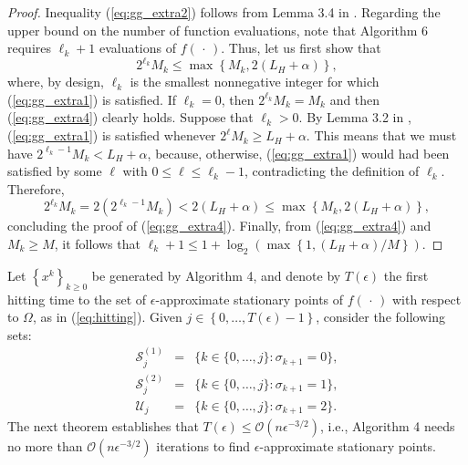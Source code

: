 \documentclass[11pt]{article}
\begin{document}
\begin{proof}
    Inequality (\ref{eq:gg_extra2}) follows from Lemma 3.4 in \cite{BM}. Regarding the upper bound on the number of function evaluations, note that Algorithm 6 requires $\ell_{k}+1$ evaluations of $f(\,\cdot\,)$. Thus, let us first show that
    \begin{equation}
     2^{\ell_{k}}M_{k}\leq\max\left\{M_{k},2(L_{H}+\alpha)\right\},
    \label{eq:gg_extra4}
    \end{equation}
    where, by design, $\ell_{k}$ is the smallest nonnegative integer for which (\ref{eq:gg_extra1}) is satisfied. If $\ell_{k}=0$, then $2^{\ell_{k}}M_{k}=M_{k}$ and then (\ref{eq:gg_extra4}) clearly holds. Suppose that $\ell_{k}>0$. By Lemma 3.2 in \cite{BM}, (\ref{eq:gg_extra1}) is satisfied whenever $2^{\ell}M_{k}\geq L_{H}+\alpha$. This means that we must have $2^{\ell_{k}-1}M_{k}<L_{H}+\alpha$, because, otherwise, (\ref{eq:gg_extra1}) would had been satisfied by some $\ell$ with $0\leq \ell\leq\ell_{k}-1$, contradicting the definition of $\ell_{k}$. Therefore, 
    \[
        2^{\ell_{k}}M_{k}=2\left(2^{\ell_{k}-1}M_{k}\right)<2(L_{H}+\alpha)\leq\max\left\{M_{k},2(L_{H}+\alpha)\right\},
    \]
    concluding the proof of (\ref{eq:gg_extra4}). Finally, from (\ref{eq:gg_extra4}) and $M_{k}\geq M$, it follows that $\ell_{k}+1\leq 1+\log_{2}\left(\max\left\{1,(L_{H}+\alpha)/M\right\}\right)$.
\end{proof}

Let $\left\{x^{k}\right\}_{k\geq 0}$ be generated by Algorithm 4, and denote by $T(\epsilon)$ the first hitting time to the set of $\epsilon$-approximate stationary points of $f(\,\cdot\,)$ with respect to $\Omega$, as in (\ref{eq:hitting}). Given $j\in\left\{0,\dots,T(\epsilon)-1\right\}$, consider the following sets:
\[
\begin{array}{rcl}
\mathcal{S}_{j}^{(1)} &=& \{k\in\{0,\dots,j\}:\sigma_{k+1}=0\},\\
\mathcal{S}_{j}^{(2)} &=& \{k\in\{0,\dots,j\}:\sigma_{k+1}=1\},\\
\mathcal{U}_{j} &=& \{k\in\{0,\dots,j\}:\sigma_{k+1}=2\}.
\end{array}
\]
The next theorem establishes that $T(\epsilon)\leq\mathcal{O}\left(n\epsilon^{-3/2}\right)$, i.e., Algorithm 4 needs no more than $\mathcal{O}(n\epsilon^{-3/2})$ iterations to find $\epsilon$-approximate stationary points.
\end{document}
